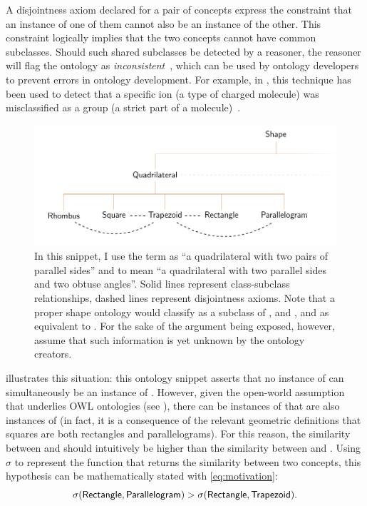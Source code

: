 A disjointness axiom declared for a pair of concepts express the constraint that an instance of one of them cannot also be an instance of the other. This constraint logically implies that the two concepts cannot have common subclasses. Should such shared subclasses be detected by a reasoner, the reasoner will flag the ontology as \emph{inconsistent}~\citep{Sattler2013}, which can be used by ontology developers to prevent errors in ontology development. For example, in , this technique has been used to detect that a specific ion (a type of charged molecule) was misclassified as a group (a strict part of a molecule)~\citep{Hastings2012}.

\begin{figure}
    \centering
    \includegraphics[width=\textwidth]{images/shape-ontology.pdf}
    \caption[A snippet of a hypothetical Shape Ontology]{In this snippet, I use the term  as ``a quadrilateral with two pairs of parallel sides'' and  to mean ``a quadrilateral with two parallel sides and two obtuse angles''. Solid lines represent class-subclass relationships, dashed lines represent disjointness axioms. Note that a proper shape ontology would classify  as a subclass of ,  and , and  as equivalent to . For the sake of the argument being exposed, however, assume that such information is yet unknown by the ontology creators.}
    \label{fig:shape}
\end{figure}

 illustrates this situation: this ontology snippet asserts that no instance of  can simultaneously be an instance of . However, given the open-world assumption that underlies OWL ontologies (see ), there can be instances of  that are also instances of  (in fact, it is a consequence of the relevant geometric definitions that squares are both rectangles and parallelograms). For this reason, the similarity between  and  should intuitively be higher than the similarity between  and . Using $\sigma$ to represent the function that returns the similarity between two concepts, this hypothesis can be mathematically stated with \eqref{eq:motivation}:
\begin{equation}
    \sigma(\protect\textsf{Rectangle}, \protect\textsf{Parallelogram}) >
    \sigma(\protect\textsf{Rectangle}, \protect\textsf{Trapezoid}).
    \label{eq:motivation}
\end{equation}


